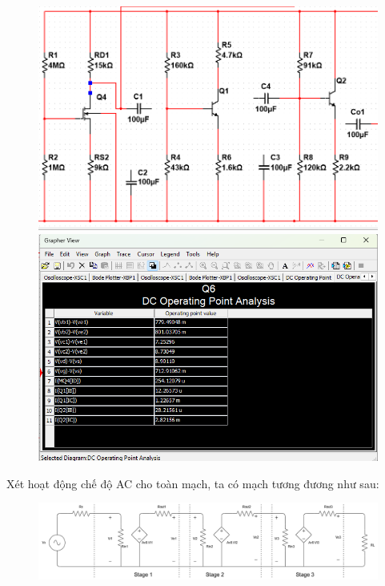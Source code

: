 \begin{figure}[H]
	\centering
	\begin{minipage}{.4\linewidth}
		\includegraphics[width=\linewidth]{./my-chapters/my-images/Question6/a_machdophancuc.png}
	\end{minipage}
	\begin{minipage}{.4\linewidth}
	\includegraphics[width=\linewidth]{./my-chapters/my-images/Question6/a_dophancuc.png}
	\end{minipage}
\end{figure}


\noindent Xét hoạt động chế độ AC cho toàn mạch, ta có mạch tương đương như sau:

\begin{figure}[H]
	\centering
	\includegraphics[width=.9\linewidth]{./my-chapters/my-diagrams/Question6/caub_tongquat.png}
\end{figure}

